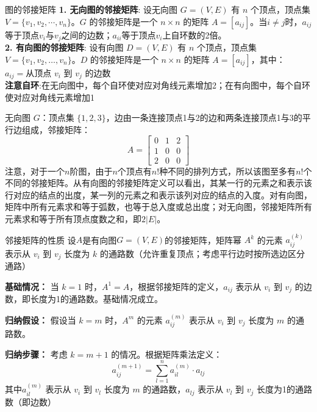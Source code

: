 \documentclass[lang=cn,11pt]{elegantbook}
\begin{document}
\begin{definition}{图的邻接矩阵}
\textbf{1. 无向图的邻接矩阵}:
设无向图 $G = (V, E)$ 有 $n$ 个顶点，顶点集 $V = \{v_1, v_2, \cdots, v_n\}$。$G$ 的邻接矩阵是一个 $n \times n$ 的矩阵 $A = [a_{ij}]$。当$i\ne j$时，$a_{ij}$等于顶点$v_i$与$v_j$之间的边数；$a_{ii}$等于顶点$v_i$上自环数的2倍。\\
\textbf{2. 有向图的邻接矩阵}:
设有向图 $D = (V, E)$ 有 $n$ 个顶点，顶点集 $V = \{v_1, v_2, \ldots, v_n\}$。$D$ 的邻接矩阵是一个 $n \times n$ 的矩阵 $A = [a_{ij}]$，其中：$a_{ij} = \text{从顶点 } v_i \text{ 到 } v_j \text{ 的边数}$\\
\textbf{注意自环}:在无向图中，每个自环使对应对角线元素增加2；在有向图中，每个自环使对应对角线元素增加1
\end{definition}
无向图 $G$：顶点集 $\{1,2,3\}$，边由一条连接顶点1与2的边和两条连接顶点1与3的平行边组成，邻接矩阵：\[
A = \begin{bmatrix}
0 & 1 & 2 \\
1 & 0 & 0 \\
2 & 0 & 0
\end{bmatrix}\]
注意，对于一个$n$阶图，由于$n$个顶点有$n!$种不同的排列方式，所以该图至多有$n!$个不同的邻接矩阵。从有向图的邻接矩阵定义可以看出，其某一行的元素之和表示该行对应的结点的出度，某一列的元素之和表示该列对应的结点的入度。对有向图，矩阵中所有元素求和等于弧数，也等于总入度或总出度；对无向图，邻接矩阵所有元素求和等于所有顶点度数之和，即$2|E|$。
\begin{theorem}{邻接矩阵的性质}
设$A$是有向图$G=(V,E)$的邻接矩阵，矩阵幂 $A^k$ 的元素 $a_{ij}^{(k)}$ 表示从 $v_i$ 到 $v_j$ 长度为 $k$ 的通路数（允许重复顶点；考虑平行边时按所选边区分通路）
\end{theorem}
\textbf{基础情况：} 当 $k=1$ 时，$A^1 = A$，根据邻接矩阵的定义，$a_{ij}$ 表示从 $v_i$ 到 $v_j$ 的边数，即长度为1的通路数。基础情况成立。

\textbf{归纳假设：} 假设当 $k = m$ 时，$A^m$ 的元素 $a_{ij}^{(m)}$ 表示从 $v_i$ 到 $v_j$ 长度为 $m$ 的通路数。

\textbf{归纳步骤：} 考虑 $k = m+1$ 的情况。根据矩阵乘法定义：
\[
a_{ij}^{(m+1)} = \sum_{l=1}^{n} a_{il}^{(m)} \cdot a_{lj}
\]
其中$a_{il}^{(m)}$ 表示从 $v_i$ 到 $v_l$ 长度为 $m$ 的通路数，$a_{lj}$ 表示从 $v_l$ 到 $v_j$ 长度为1的通路数（即边数）
\end{document}
